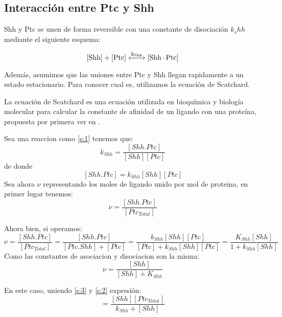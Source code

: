  \subsection{Interacción entre Ptc y Shh}
 Shh y Ptc se unen de forma reversible con una constante de disociación $k_shh$ mediante el siguiente esquema: 
 
\begin{equation}
\ce{[Shh] + [Ptc] <->[k_{Shh}] [Shh.Ptc] }
\label{s:1}
\end{equation}
 
 Además, asumimos que las uniones entre Ptc y Shh llegan rapidamente a un estado estacionario. Para conocer cual es, utilizamos la ecuación de Scatchard.
 
 La ecuación de Scatchard es una ecuación utilizada en bioquímica y biología molecular para calcular la constante de afinidad de un ligando con una proteína, propuesta por primera ver en \cite{scatchard1949attractions}. 
 
 Sea una reaccion como \ref{s:1} tenemos que: 
 $$k_{Shh}=\frac{[Shh.Ptc]}{[Shh][Ptc]}$$
 de donde 
 $$[Shh.Ptc]=k_{Shh}[Shh][Ptc]$$
 Sea ahora $\nu$ representando los moles de ligando unido por mol de proteina, en primer lugar tenemos:
 \begin{equation}
 \nu=\frac{[Shh.Ptc]}{[Ptc_{Total}]}
 \label{s:2}
 \end{equation}
 
 Ahora bien, si operamos:
 $$\nu=\frac{[Shh.Ptc]}{[Ptc_{Total}]}=\frac{[Shh.Ptc]}{[Ptc.Shh]+[Ptc]}=\frac{k_{Shh}[Shh][Ptc]}{[Ptc]+k_{Shh}[Shh][Ptc]}=\frac{K_{Shh}[Shh]}{1+k_{Shh}[Shh]}$$
 Como las constantes de asociacion y disociacion son la misma: \begin{equation}
 \nu=\frac{[Shh]}{[Shh]+K_{Shh}}
 \label{s:3}
 \end{equation}
 
 En este caso, uniendo \ref{s:3} y \ref{s:2} expresión: 
 \begin{equation}
 [Shh.Ptc]=\frac{[Shh][Ptc_{Total}]}{k_{Shh}+[Shh]}
 \label{s:6}
 \end{equation}
 
